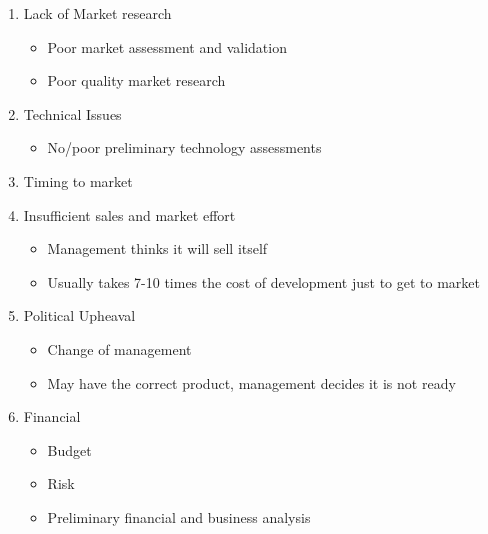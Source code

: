 \documentclass{article}
\begin{document}
\begin{enumerate}
    
    \item{Lack of Market research}
        \begin{itemize}
            \item{Poor market assessment and validation}
            \item{Poor quality market research}
        \end{itemize}

    \item{Technical Issues}
        \begin{itemize}
            \item{No/poor preliminary technology assessments}
        \end{itemize}

    \item{Timing to market}

    \item{Insufficient sales and market effort}
        \begin{itemize}
            \item{Management thinks it will sell itself}
            \item{Usually takes 7-10 times the cost of development just to get to market}
        \end{itemize}

    \item{Political Upheaval}
        \begin{itemize}
            \item{Change of management}
            \item{May have the correct product, management decides it is not ready}
        \end{itemize}

    \item{Financial}
        \begin{itemize}
            \item{Budget}
            \item{Risk}
            \item{Preliminary financial and business analysis}
        \end{itemize}

\end{enumerate}
\end{document}

